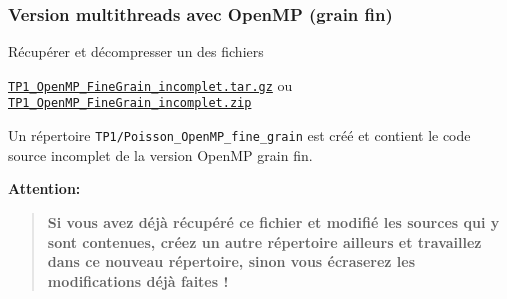 \documentclass{beamer}
\begin{document}
\begin{frame}[fragile]
	\frametitle{Version multithreads avec OpenMP (grain fin)}
	
Récupérer et décompresser un des fichiers \bigskip

\href{https://perso.ensta-paris.fr/~tajchman/Seance3/TP1_OpenMP_FineGrain_incomplet.tar.gz}{\tt TP1\_OpenMP\_FineGrain\_incomplet.tar.gz} ou \href{https://perso.ensta-paris.fr/~tajchman/Seance3/TP1_OpenMP_FineGrain_incomplet.zip}{\tt TP1\_OpenMP\_FineGrain\_incomplet.zip}
\bigskip

Un répertoire {\tt TP1/Poisson\_OpenMP\_fine\_grain} est créé et contient le code source incomplet de la version OpenMP grain fin.
 
\vfill
{\color{red}\bf
	Attention:
	\begin{quote}\color{red}\bf
Si vous avez déjà récupéré ce fichier et modifié les sources qui y sont contenues, créez un autre répertoire ailleurs et travaillez dans ce nouveau répertoire, sinon vous écraserez les modifications déjà faites !
	\end{quote}
}
\vfill
\end{frame}
\end{document}
